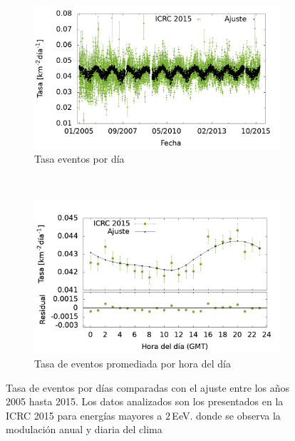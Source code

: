         \begin{figure}[H]
            \centering
            \begin{subfigure}[b]{0.5\textwidth}
            \includegraphics[width=\textwidth]{Graphs/rate_dayly/2EeV_ICRC_2015.png}
            \caption{Tasa eventos por día}\label{fig:rate_dayly_ICRC_2015_2EeV}
            \end{subfigure}\\
            \begin{subfigure}[b]{0.5\textwidth}
            \includegraphics[width=\textwidth]{Graphs/rate_hour_of_the_day/2EeV_ICRC_2015_old_herald.png}
            \caption{Tasa de eventos promediada por hora del día }\label{fig:rate_hod_ICRC_2015_2EeV}
            \end{subfigure}%
            \caption{Tasa de eventos por días comparadas con el ajuste entre los años 2005 hasta 2015. Los datos analizados son los presentados en la ICRC 2015 para energías mayores a $2\,$EeV. donde se observa la modulación anual y diaria del clima }\label{fig:rate_2015_05-15_2EeV}
        \end{figure}

